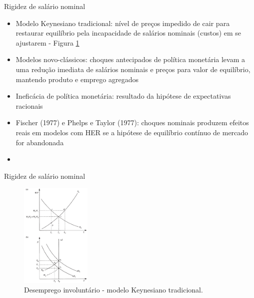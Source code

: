 \documentclass[10pt]{beamer}
\begin{document}
\begin{frame}{Rigidez de salário nominal}
    \begin{itemize}
        \item Modelo Keynesiano tradicional: nível de preços impedido de cair para restaurar equilíbrio pela incapacidade de salários nominais (custos) em se ajustarem - Figura \ref{fig2}\bigskip
        \item Modelos novo-clássicos: choques antecipados de política monetária levam a uma redução imediata de salários nominais e preços para valor de equilíbrio, mantendo produto e emprego agregados\bigskip
        \item Ineficácia de política monetária: resultado da hipótese de expectativas racionais\bigskip
        \item Fischer (1977) e Phelps e Taylor (1977): choques nominais produzem efeitos reais em modelos com HER se a hipótese de equilíbrio contínuo de mercado for abandonada\bigskip
        \item {}
    \end{itemize}
\end{frame}

\begin{frame}{Rigidez de salário nominal}
    \begin{figure}
        \centering
        \includegraphics[width=0.3\textwidth]{./figures/aula5_fig1.PNG}
        \caption{Desemprego involuntário - modelo Keynesiano tradicional.}
        \label{fig2}
    \end{figure}
\end{frame}
\end{document}
